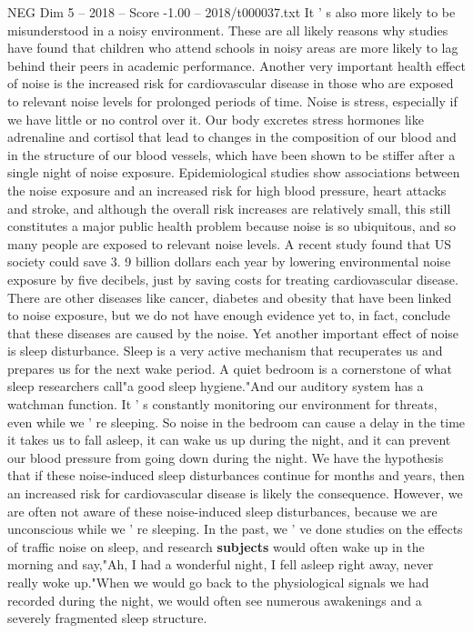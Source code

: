 \begin{textsample}{NEG Dim 5 – 2018 – Score -1.00 – 2018/t000037.txt}
It ' s also more likely to be misunderstood in a noisy environment.
These are all likely reasons why studies have found that children who attend schools in noisy areas are more likely to lag behind their peers in academic performance.
Another very important health effect of noise is the increased risk for cardiovascular disease in those who are exposed to relevant noise levels for prolonged periods of time.
Noise is stress, especially if we have little or no control over it.
Our body excretes stress hormones like adrenaline and cortisol that lead to changes in the composition of our blood and in the structure of our blood vessels, which have been shown to be stiffer after a single night of noise exposure.
Epidemiological studies show associations between the noise exposure and an increased risk for high blood pressure, heart attacks and stroke, and although the overall risk increases are relatively small, this still constitutes a major public health problem because noise is so ubiquitous, and so many people are exposed to relevant noise levels.
A recent study found that US society could save 3. 9 billion dollars each year by lowering environmental noise exposure by five decibels, just by saving costs for treating cardiovascular disease.
There are other diseases like cancer, diabetes and obesity that have been linked to noise exposure, but we do not have enough evidence yet to, in fact, conclude that these diseases are caused by the noise.
Yet another important effect of noise is sleep disturbance.
Sleep is a very active mechanism that recuperates us and prepares us for the next wake period.
A quiet bedroom is a cornerstone of what sleep researchers call"a good sleep hygiene."And our auditory system has a watchman function.
It ' s constantly monitoring our environment for threats, even while we ' re sleeping.
So noise in the bedroom can cause a delay in the time it takes us to fall asleep, it can wake us up during the night, and it can prevent our blood pressure from going down during the night.
We have the hypothesis that if these noise-induced sleep disturbances continue for months and years, then an increased risk for cardiovascular disease is likely the consequence.
However, we are often not aware of these noise-induced sleep disturbances, because we are unconscious while we ' re sleeping.
In the past, we ' ve done studies on the effects of traffic noise on sleep, and research \textbf{subjects} would often wake up in the morning and say,"Ah, I had a wonderful night, I fell asleep right away, never really woke up."When we would go back to the physiological signals we had recorded during the night, we would often see numerous awakenings and a severely fragmented sleep structure.

\end{textsample}

